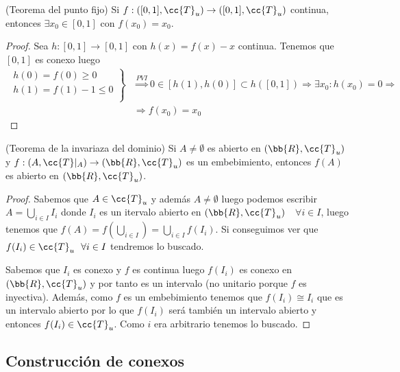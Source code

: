 \begin{teo}
    (Teorema del punto fijo) Si $f:([0,1], \cc{T}_u)\to ([0,1], \cc{T}_u)$ continua, entonces $\exists x_0 \in [0,1]$ con $f(x_0)=x_0$.
    \begin{proof}
        Sea $h:[0,1]\to [0,1]$ con $h(x)=f(x)-x$ continua. Tenemos que $[0,1]$ es conexo luego
        \begin{align*}
            \left.
            \begin{array}{c}
                h(0)=f(0)\geq 0\\
                h(1)=f(1)-1 \leq 0\\
            \end{array}
            \right\} &\overset{PVI}{\Rightarrow} 0 \in [h(1),h(0)] \subset h([0,1]) \Rightarrow \exists x_0 : h(x_0)=0 \Rightarrow \\
            &\Rightarrow f(x_0) = x_0
        \end{align*}
    \end{proof}
\end{teo}

\begin{teo}
    (Teorema de la invariaza del dominio) Si $A\neq \emptyset $ es abierto en $(\bb{R}, \cc{T}_u)$ y $f:(A, \cc{T}|_A)\to (\bb{R}, \cc{T}_u)$ es un embebimiento, entonces $f(A)$ es abierto en $(\bb{R}, \cc{T}_u)$.

    \begin{proof}
        Sabemos que $A\in \cc{T}_u$ y además $A\neq \emptyset$ luego podemos escribir $A=\bigcup\limits_{i\in I}I_i$ donde $I_i$ es un itervalo abierto en $(\bb{R}, \cc{T}_u)$\ \ $\forall i \in I$, luego tenemos que $f(A)=f(\bigcup\limits_{i\in I})=\bigcup\limits_{i\in I}f(I_i)$. Si conseguimos ver que $f(I_i)\in \cc{T}_u\ \ \forall i \in I$ tendremos lo buscado. 

        Sabemos que $I_i$ es conexo y $f$ es continua luego $f(I_i)$ es conexo en $(\bb{R}, \cc{T}_u)$ y por tanto es un intervalo (no unitario porque $f$ es inyectiva). Además, como $f$ es un embebimiento tenemos que $f(I_i)\cong I_i$ que es un intervalo abierto por lo que $f(I_i)$ será también un intervalo abierto y entonces $f(I_i)\in \cc{T}_u$. Como $i$ era arbitrario tenemos lo buscado.

    \end{proof}
\end{teo}

\subsection{Construcción de conexos}

